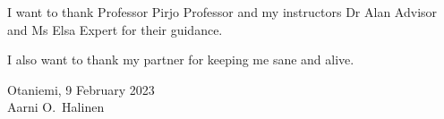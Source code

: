\documentclass[english, 12pt, a4paper, sci, utf8, a-2b, online]{aaltothesis}
\begin{document}
\newpage

\dothesispagenumbering{}

I want to thank Professor Pirjo Professor and my instructors Dr Alan Advisor and
Ms Elsa Expert for their guidance.

I also want to thank my partner for keeping me sane and alive.

\vspace{5cm}
Otaniemi, 9 February 2023 \\

\vspace{5mm}
{\hfill Aarni O.\ Halinen \hspace{1cm}}

\newpage

\thesistableofcontents

\end{document}
